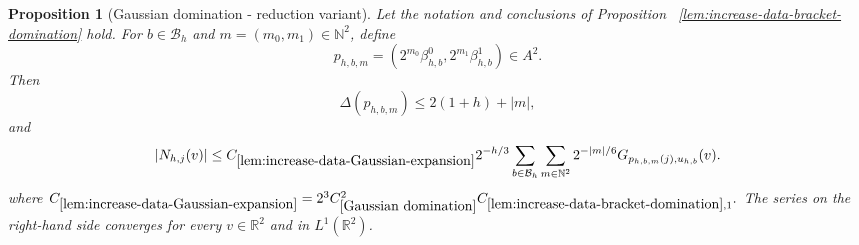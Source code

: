 \documentclass[12pt,reqno]{amsart}
\theoremstyle{plain}
\newtheorem{proposition}[theorem]{Proposition}
\numberwithin{equation}{section}
\theoremstyle{remark}
\newcommand{\uses}[1]{}
\newcommand{\usesdefs}[1]{}
\begin{document}
\begin{proposition}[Gaussian domination - reduction variant]
\label{lem:increase-data-Gaussian-expansion}\uses{Gaussian domination,lem:increase-data-bracket-domination,Operations on spaced sequences,Properties of distance of sequences}\usesdefs{gaussian,bracket bump,multiplicatively spaced monotone sequences,Distance of spaced sequences,geometric parameters,auto:unitary-matrices-definition,2D Gaussians}
Let the notation and conclusions of Proposition~
\ref{lem:increase-data-bracket-domination} hold. For
\(b\in\mathcal B_h\) and
\(m=(m_0,m_1)\in\mathbb N^2\), define
\begin{equation}\label{auto:Gaussian-domination-rescaled-pairs}
p_{h,b,m}
=
\left(
2^{m_0}\beta_{h,b}^0,
2^{m_1}\beta_{h,b}^1
\right)\in A^2.
\end{equation}
Then
\begin{equation}
    \label{E:increase-data-p-distance}
    \Delta(p_{h,b,m})
    \leq
    2(1+h)
    +
    |m|,
\end{equation}
and
\begin{equation}
    \label{E:increase-data-Gaussian-majorant}
    |N_{h,j}(v)| \leq C_{\ref{lem:increase-data-Gaussian-expansion}} 2^{-h/3} \sum_{b\in\mathcal B_h} \sum_{m\in\mathbb N^2} 2^{-|m|/6} G_{p_{h,b,m}(j),u_{h,b}}(v).
\end{equation}
where $ C_{\ref{lem:increase-data-Gaussian-expansion}}
    =
    2^3C_{\ref{Gaussian domination}}^2C_{\ref{lem:increase-data-bracket-domination},1}.$
The   series on the right-hand side converges for every
\(v\in\mathbb R^2\) and in \(L^1(\mathbb R^2)\).
\end{proposition}
\end{document}
